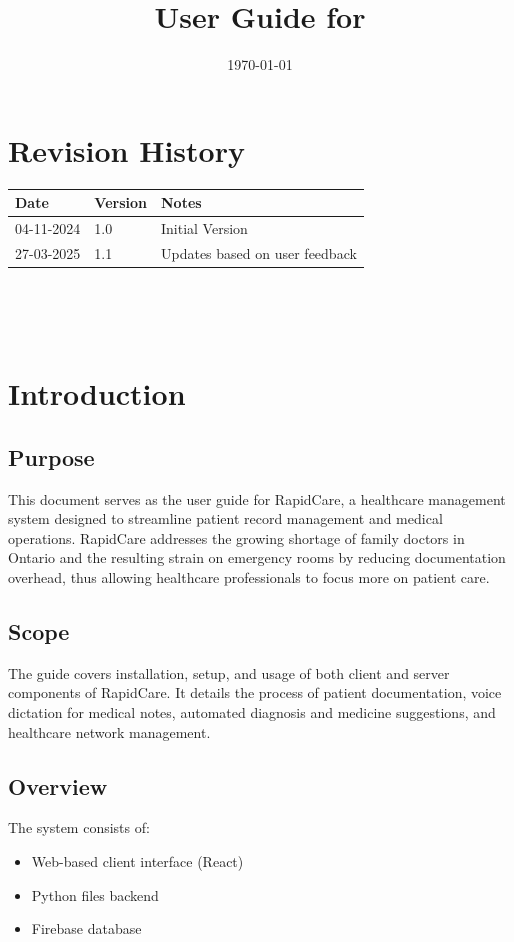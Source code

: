 \documentclass[12pt, titlepage]{article}
\title{User Guide for \progname}
\author{\authname}
\date{\today}
\begin{document}
\maketitle


\section*{Revision History}

\begin{tabularx}{\textwidth}{p{3cm}p{2cm}X}
\toprule {\bf Date} & {\bf Version} & {\bf Notes}\\
\midrule
04-11-2024 & 1.0 & Initial Version\\
27-03-2025 & 1.1 & Updates based on user feedback\\
\bottomrule
\end{tabularx}

~\newpage

\tableofcontents

\listoffigures

~\newpage


\section{Introduction}
\subsection{Purpose}
This document serves as the user guide for RapidCare, a healthcare management system designed to streamline patient record management and medical operations. RapidCare addresses the growing shortage of family doctors in Ontario and the resulting strain on emergency rooms by reducing documentation overhead, thus allowing healthcare professionals to focus more on patient care.

\subsection{Scope}
The guide covers installation, setup, and usage of both client and server components of RapidCare. It details the process of patient documentation, voice dictation for medical notes, automated diagnosis and medicine suggestions, and healthcare network management.

\subsection{Overview}
The system consists of:
\begin{itemize}
\item Web-based client interface (React)
\item Python files backend
\item Firebase database
\end{itemize}
\end{document}
